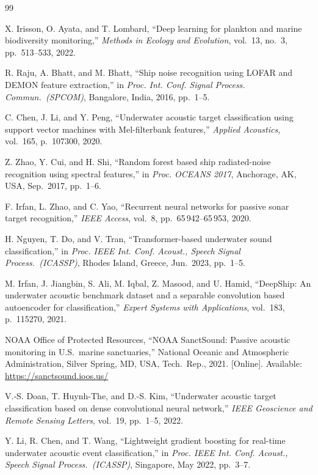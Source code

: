 \documentclass[conference]{IEEEtran}
\begin{document}
\begin{thebibliography}{99}

X. Irisson, O. Ayata, and T. Lombard,
``Deep learning for plankton and marine biodiversity monitoring,''
\textit{Methods in Ecology and Evolution},
vol.~13, no.~3, pp.~513--533, 2022.

R. Raju, A. Bhatt, and M. Bhatt,
``Ship noise recognition using LOFAR and DEMON feature extraction,''
in \textit{Proc. Int. Conf. Signal Process. Commun.\ (SPCOM)},
Bangalore, India, 2016, pp.~1--5.

C. Chen, J. Li, and Y. Peng,
``Underwater acoustic target classification using support vector machines
with Mel-filterbank features,''
\textit{Applied Acoustics}, vol.~165, p.~107300, 2020.

Z. Zhao, Y. Cui, and H. Shi,
``Random forest based ship radiated-noise recognition using spectral features,''
in \textit{Proc. OCEANS 2017},
Anchorage, AK, USA, Sep.~2017, pp.~1--6.

F. Irfan, L. Zhao, and C. Yao,
``Recurrent neural networks for passive sonar target recognition,''
\textit{IEEE Access}, vol.~8, pp.~65\,942--65\,953, 2020.

H. Nguyen, T. Do, and V. Tran,
``Transformer-based underwater sound classification,''
in \textit{Proc. IEEE Int. Conf. Acoust., Speech Signal Process.\ (ICASSP)},
Rhodes Island, Greece, Jun.~2023, pp.~1--5.

M. Irfan, J. Jiangbin, S. Ali, M. Iqbal, Z. Masood, and U. Hamid,
``DeepShip: An underwater acoustic benchmark dataset and a separable
convolution based autoencoder for classification,''
\textit{Expert Systems with Applications}, vol.~183, p.~115270, 2021.

NOAA Office of Protected Resources,
``NOAA SanctSound: Passive acoustic monitoring in U.S.\ marine sanctuaries,''
National Oceanic and Atmospheric Administration,
Silver Spring, MD, USA, Tech.\ Rep., 2021. [Online].
Available: \url{https://sanctsound.ioos.us/}

V.-S. Doan, T. Huynh-The, and D.-S. Kim,
``Underwater acoustic target classification based on dense convolutional
neural network,''
\textit{IEEE Geoscience and Remote Sensing Letters},
vol.~19, pp.~1--5, 2022.

Y. Li, R. Chen, and T. Wang,
``Lightweight gradient boosting for real-time underwater acoustic event
classification,''
in \textit{Proc. IEEE Int. Conf. Acoust., Speech Signal Process.\ (ICASSP)},
Singapore, May 2022, pp.~3--7.


\end{thebibliography}
\end{document}
